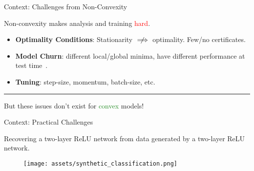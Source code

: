 \documentclass[usenames,dvipsnames,mathserif,notheorems]{beamer}
\newcommand{\horizontalrule}{
	{
			\vspace{-0.5em}
			\center \rule{\textwidth}{0.1em}
			\vspace{-0.2em}
		}
}
\newcommand{\red}[1]{\textcolor{Red}{#1}}
\newcommand{\green}[1]{\textcolor{ForestGreen}{#1}}
\begin{document}
\begin{frame}{Context: Challenges from Non-Convexity}
	\begin{center}
		\Large
		Non-convexity makes analysis and training \red{hard}.
	\end{center}

	\pause
	\begin{itemize}
		\item \textbf{Optimality Conditions}: Stationarity \( \centernot \implies \) optimality.
		      Few/no certificates.

		      \pause
		\item \textbf{Model Churn}: different local/global minima,
		      have different performance at test time~\citep{henderson2018deep}.

		      \pause
		\item \textbf{Tuning}: step-size, momentum, batch-size, etc.
	\end{itemize}

	\pause
	\horizontalrule

	\vspace{-2ex}

	\begin{center}
		\Large
		But these issues don't exist for \green{convex} models!
	\end{center}




\end{frame}

\begin{frame}{Context: Practical Challenges}

	\begin{center}
		\large
		Recovering a two-layer ReLU network from data generated by a two-layer ReLU network.
	\end{center}

	\pause

	\begin{figure}[]
		\centering
		\texttt{[image: assets/synthetic\_classification.png]}
	\end{figure}
\end{frame}
\end{document}
